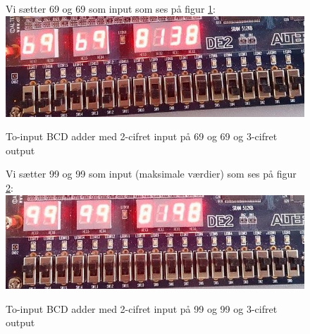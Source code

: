 \begin{enumerate}
\begin{figure}[h]
	Vi sætter 69 og 69 som input som ses på figur \ref{fig:BCD_2seg_adder_138}:
	\centering
	\includegraphics[scale=0.6]{pictures/Oevelse4/BCD_adder/BCD_2seg_adder_138.jpg}
	\caption{To-input BCD adder med 2-cifret input på 69 og 69 og 3-cifret output}
	\label{fig:BCD_2seg_adder_138}
\end{figure}

\begin{figure}[h]
	Vi sætter 99 og 99 som input (maksimale værdier) som ses på figur \ref{fig:BCD_2seg_adder_198}:
	\centering
	\includegraphics[scale=0.6]{pictures/Oevelse4/BCD_adder/BCD_2seg_adder_198.jpg}
	\caption{To-input BCD adder med 2-cifret input på 99 og 99 og 3-cifret output}
	\label{fig:BCD_2seg_adder_198}
\end{figure}
\end{enumerate}